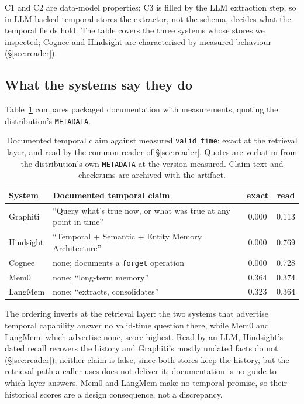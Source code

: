 \documentclass[conference]{IEEEtran}
\begin{document}
C1 and C2 are data-model properties; C3 is filled by the LLM extraction step,
so in LLM-backed temporal stores the extractor, not the schema, decides what the
temporal fields hold. The table covers the three systems whose stores we
inspected; Cognee and Hindsight are characterised by measured behaviour
(\S\ref{sec:reader}).

\subsection{What the systems say they do}
\label{sec:claims}

Table~\ref{tab:claims} compares packaged documentation with measurements,
quoting the distribution's \texttt{METADATA}.

\begin{table}[t]
\centering
\caption{Documented temporal claim against measured \texttt{valid\_time}: exact at
the retrieval layer, and read by the common reader of \textup{\S}\ref{sec:reader}. Quotes are verbatim from the distribution's own
\texttt{METADATA} at the version measured.
Claim text and checksums are archived with the artifact.}
\label{tab:claims}
\small
\begin{tabular}{@{}l>{\raggedright\arraybackslash}p{3.7cm}cc@{}}
\toprule
System & Documented temporal claim & exact & read \\
\midrule
Graphiti  & ``Query what's true now, or what was true at any point in time'' & 0.000 & 0.113 \\
Hindsight & ``Temporal + Semantic + Entity Memory Architecture'' & 0.000 & 0.769 \\
Cognee    & none; documents a \texttt{forget} operation & 0.000 & 0.728 \\
Mem0      & none; ``long-term memory'' & 0.364 & 0.374 \\
LangMem   & none; ``extracts, consolidates'' & 0.323 & 0.364 \\
\bottomrule
\end{tabular}
\end{table}

The ordering inverts at the retrieval layer: the two systems that advertise
temporal capability answer no valid-time question there, while Mem0 and
LangMem, which advertise none, score highest. Read by an LLM, Hindsight's dated
recall recovers the history and Graphiti's mostly undated facts do not
(\S\ref{sec:reader}); neither claim is false, since both stores keep the
history, but the retrieval path a caller uses does not deliver it; documentation
is no guide to which layer answers. Mem0 and LangMem make no temporal promise,
so their historical scores are a design consequence, not a discrepancy.
\end{document}
